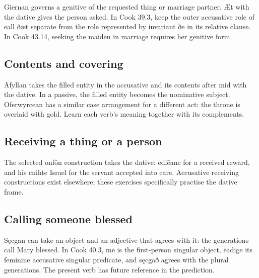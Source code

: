 Giernan governs a genitive of the requested thing or marriage partner. Æt with the dative gives the person asked. In Cook 39.3, keep the outer accusative role of eall ðæt separate from the role represented by invariant ðe in its relative clause. In Cook 43.14, seeking the maiden in marriage requires her genitive form.

\subsection*{Contents and covering}

Āfyllan takes the filled entity in the accusative and its contents after mid with the dative. In a passive, the filled entity becomes the nominative subject. Oferwyrcean has a similar case arrangement for a different act: the throne is overlaid with gold. Learn each verb’s meaning together with its complements.

\subsection*{Receiving a thing or a person}

The selected onfōn construction takes the dative: edlēane for a received reward, and his cnihte Israel for the servant accepted into care. Accusative receiving constructions exist elsewhere; these exercises specifically practise the dative frame.

\subsection*{Calling someone blessed}

Sęcgan can take an object and an adjective that agrees with it: the generations call Mary blessed. In Cook 40.3, mē is the first-person singular object, ēadige its feminine accusative singular predicate, and sęcgað agrees with the plural generations. The present verb has future reference in the prediction.

